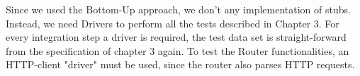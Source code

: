 Since we used the Bottom-Up approach, we don't any implementation of stubs. Instead, we need Drivers to perform all the tests described in Chapter 3. For every integration step a driver is required, the test data set is straight-forward from the specification of chapter 3 again. 
To test the Router functionalities, an HTTP-client "driver" must be used, since the router also parses HTTP requests.

